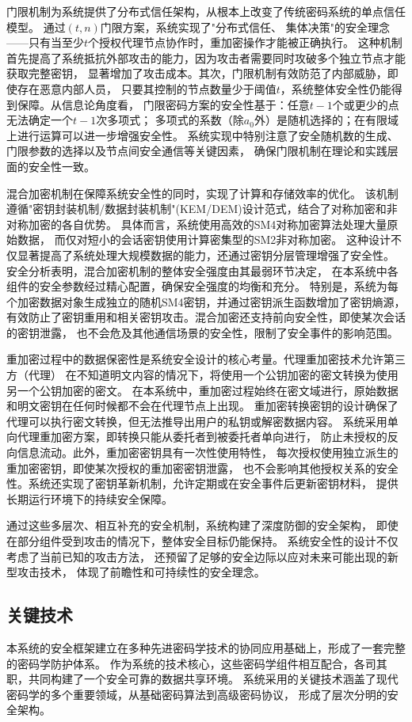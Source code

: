 门限机制为系统提供了分布式信任架构，从根本上改变了传统密码系统的单点信任模型。
通过$(t,n)$门限方案，系统实现了"分布式信任、
集体决策"的安全理念——只有当至少$t$个授权代理节点协作时，重加密操作才能被正确执行。
这种机制首先提高了系统抵抗外部攻击的能力，因为攻击者需要同时攻破多个独立节点才能获取完整密钥，
显著增加了攻击成本。其次，门限机制有效防范了内部威胁，即使存在恶意内部人员，
只要其控制的节点数量少于阈值$t$，系统整体安全性仍能得到保障。从信息论角度看，
门限密码方案的安全性基于：任意$t-1$个或更少的点无法确定一个$t-1$次多项式；
多项式的系数（除$a_0$外）是随机选择的；在有限域上进行运算可以进一步增强安全性。
系统实现中特别注意了安全随机数的生成、门限参数的选择以及节点间安全通信等关键因素，
确保门限机制在理论和实践层面的安全性一致。

混合加密机制在保障系统安全性的同时，实现了计算和存储效率的优化。
该机制遵循"密钥封装机制/数据封装机制"(KEM/DEM)设计范式，结合了对称加密和非对称加密的各自优势。
具体而言，系统使用高效的SM4对称加密算法处理大量原始数据，
而仅对短小的会话密钥使用计算密集型的SM2非对称加密。
这种设计不仅显著提高了系统处理大规模数据的能力，还通过密钥分层管理增强了安全性。
安全分析表明，混合加密机制的整体安全强度由其最弱环节决定，
在本系统中各组件的安全参数经过精心配置，确保安全强度的均衡和充分。
特别是，系统为每个加密数据对象生成独立的随机SM4密钥，并通过密钥派生函数增加了密钥熵源，
有效防止了密钥重用和相关密钥攻击。混合加密还支持前向安全性，即使某次会话的密钥泄露，
也不会危及其他通信场景的安全性，限制了安全事件的影响范围。

重加密过程中的数据保密性是系统安全设计的核心考量。代理重加密技术允许第三方（代理）
在不知道明文内容的情况下，将使用一个公钥加密的密文转换为使用另一个公钥加密的密文。
在本系统中，重加密过程始终在密文域进行，原始数据和明文密钥在任何时候都不会在代理节点上出现。
重加密转换密钥的设计确保了代理可以执行密文转换，但无法推导出用户的私钥或解密数据内容。
系统采用单向代理重加密方案，即转换只能从委托者到被委托者单向进行，
防止未授权的反向信息流动。此外，重加密密钥具有一次性使用特性，
每次授权使用独立派生的重加密密钥，即使某次授权的重加密密钥泄露，
也不会影响其他授权关系的安全性。系统还实现了密钥革新机制，允许定期或在安全事件后更新密钥材料，
提供长期运行环境下的持续安全保障。

通过这些多层次、相互补充的安全机制，系统构建了深度防御的安全架构，
即使在部分组件受到攻击的情况下，整体安全目标仍能保持。
系统安全性的设计不仅考虑了当前已知的攻击方法，
还预留了足够的安全边际以应对未来可能出现的新型攻击技术，
体现了前瞻性和可持续性的安全理念。

\subsection{关键技术}
本系统的安全框架建立在多种先进密码学技术的协同应用基础上，形成了一套完整的密码学防护体系。
作为系统的技术核心，这些密码学组件相互配合，各司其职，共同构建了一个安全可靠的数据共享环境。
系统采用的关键技术涵盖了现代密码学的多个重要领域，从基础密码算法到高级密码协议，
形成了层次分明的安全架构。

